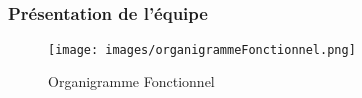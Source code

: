 \subsection{} %

\begin{frame}
\frametitle{Présentation de l'équipe}
	\begin{figure}
		\texttt{[image: images/organigrammeFonctionnel.png]}
		\caption{Organigramme Fonctionnel}
		\label{OF}
	\end{figure}
\end{frame}